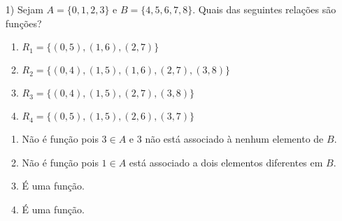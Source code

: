\documentclass{beamer}
\begin{document}
    \begin{frame}
        \begin{exemplos}
            \begin{enumerate}
                \item[1)] Sejam $A = \{0,1,2,3\}$ e $B = \{4,5,6,7,8\}$. Quais das seguintes rela{\c c}{\~o}es s{\~a}o fun{\c c}{\~o}es?
                \begin{enumerate}[label={\alph*})]
                    \item $R_1 = \{(0,5),(1,6),(2,7)\}$
                    \item $R_2 = \{(0,4),(1,5),(1,6),(2,7),(3,8)\}$
                    \item $R_3 = \{(0,4),(1,5),(2,7),(3,8)\}$
                    \item $R_4 = \{(0,5),(1,5),(2,6),(3,7)\}$
                \end{enumerate}
                \begin{solucao}
                    \begin{enumerate}[label={\alph*})]
                        \item N\~ao \'e fun\c{c}\~ao pois $3 \in A$ e $3$ n\~ao est\'a associado {\`a} nenhum elemento de $B$.
                        \item N\~ao \'e fun\c{c}\~ao pois $1 \in A$ est\'a associado a dois elementos diferentes em $B$.
                        \item \'E uma fun\c{c}\~ao.
                        \item \'E uma fun\c{c}\~ao.
                    \end{enumerate}
                \end{solucao}
            \end{enumerate}
        \end{exemplos}
    \end{frame}
\end{document}
